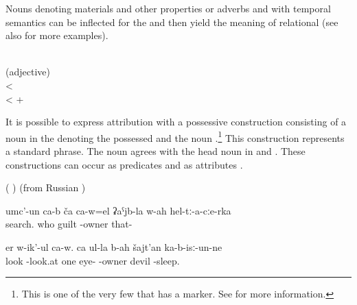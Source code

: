 Nouns denoting materials and other properties or adverbs and  with temporal semantics can be inflected for the  and then yield the meaning of relational   (see also  for more examples).

\begin{exe}
\ex	\label{ex:adjectivesWithLA}
		\TabPositions{12em}
		 		\tab	{}	 \\
		 				\tab	{}  (adjective)\\
		  <  \\
						<	   +   
\end{exe}


It is possible to express attribution with a possessive construction consisting of a noun in the  denoting the possessed and the noun  .\footnote{This is one of the very few  that has a  marker. See  for more information.} This construction represents a standard  phrase. The noun agrees with the head noun in  and . These constructions can occur as predicates  and as attributes .

\begin{exe}
	\ex	\label{ex:adjectivesWithBAH}
	\begin{xlist}
		\ex	{}  ( )
		\ex	{} 
		\ex	{}  (from Russian  )
	\end{xlist}
\end{exe}

\begin{exe}
	\ex	\label{ex:They are searching for who among them is guilty}
	\gll	umc'-un ca-b	ča 	ca-w=el	ʡaˁjb-la	w-ah	hel-tː-a-cːe-rka \\
		search. 	who		guilt	-owner	that- \\
	\glt	{}

	\ex	\label{ex:He is looking around}
	\gll	er w-ik'-ul ca-w.	ca	ul-la	b-ah	šajt'an	ka-b-isː-un-ne \\
		look -look.at 	 one	eye-	-owner	devil	-sleep. \\
	\glt	{}
\end{exe}


